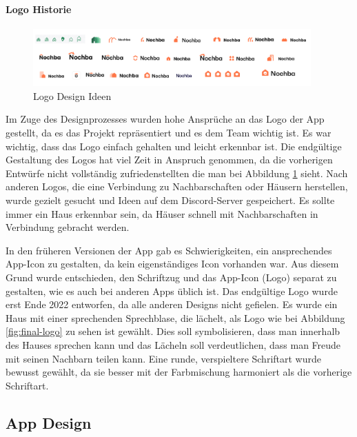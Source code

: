 
\paragraph{Logo Historie}

\begin{figure}[h]
  \centering
  \includegraphics[width=0.95\textwidth]{pics/logo-historie.png}
  \caption{Logo Design Ideen}
  \label{fig:logo-historie}
\end{figure}

Im Zuge des Designprozesses wurden hohe Ansprüche an das
Logo der App gestellt, da es das Projekt repräsentiert und
es dem Team wichtig ist. Es
war wichtig, dass das Logo einfach gehalten und leicht
erkennbar ist. Die endgültige Gestaltung des Logos hat viel Zeit
in Anspruch genommen, da die vorherigen Entwürfe nicht
vollständig zufriedenstellten die man bei Abbildung
\ref{fig:logo-historie} sieht. Nach anderen Logos, die eine
Verbindung zu Nachbarschaften oder Häusern herstellen, wurde
gezielt gesucht und Ideen auf dem Discord-Server
gespeichert. Es sollte immer ein Haus erkennbar sein, da
Häuser schnell mit Nachbarschaften in Verbindung gebracht
werden.

In den früheren Versionen der App gab es Schwierigkeiten,
ein ansprechendes App-Icon zu gestalten, da kein
eigenständiges Icon vorhanden war. Aus diesem Grund wurde
entschieden, den Schriftzug und das App-Icon (Logo) separat
zu gestalten, wie es auch bei anderen Apps üblich ist. Das
endgültige Logo wurde erst Ende 2022 entworfen, da alle
anderen Designs nicht gefielen. Es wurde ein Haus mit einer
sprechenden Sprechblase, die lächelt, als Logo
wie bei Abbildung \ref{fig:final-logo} zu sehen ist gewählt. Dies soll symbolisieren, dass
man innerhalb des Hauses sprechen kann und das Lächeln soll
verdeutlichen, dass man Freude mit seinen Nachbarn teilen
kann. Eine runde, verspieltere Schriftart wurde bewusst
gewählt, da sie besser mit der Farbmischung harmoniert als
die vorherige Schriftart.



\subsection{App Design}
